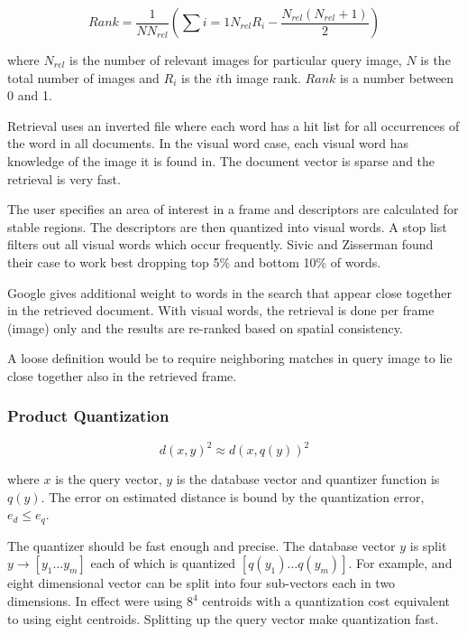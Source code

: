 \documentclass[english,12pt,a4paper,pdftex,elec,utf8]{aaltothesis}
\begin{document}
\begin{equation}\label{bowrank}
  Rank = \frac{1}{NN_{rel}}\left(\sum{i=1}{N_{rel}}R_{i}-\frac{N_{rel}(N_{rel} + 1)}{2}\right)
\end{equation}

where $N_{rel}$ is the number of relevant images for particular query image, $N$ is the total number of images and $R_{i}$ is the $i$th image rank. $Rank$ is a number between 0 and 1.

Retrieval uses an inverted file where each word has a hit list for all occurrences of the word in all documents. In the visual word case, each visual word has knowledge of the image it is found in. The document vector is sparse and the retrieval is very fast.

The user specifies an area of interest in a frame and descriptors are calculated for stable regions. The descriptors are then quantized into visual words. A stop list filters out all visual words which occur frequently. Sivic and Zisserman found their case to work best dropping top 5\% and bottom 10\% of words.

Google gives additional weight to words in the search that appear close together in the retrieved document. With visual words, the retrieval is done per frame (image) only and the results are re-ranked based on spatial consistency.

A loose definition would be to require neighboring matches in query image to lie close together also in the retrieved frame.

\subsubsection{Product Quantization} \label{PQ}

\begin{equation}
  \label{quantizereq}
d(x,y)^2 \approx d(x,q(y))^2
\end{equation}

where $x$ is the query vector, $y$ is the database vector and quantizer function is $q(y)$. The error on estimated distance is bound by the quantization error, $e_d \leq e_q$.  \cite{Jegou2014}

The quantizer should be fast enough and precise. The database vector $y$ is split $y \rightarrow [y_1 \ldots y_m]$ each of which is quantized $[q(y_1)\ldots q(y_m)]$. For example, and eight dimensional vector can be split into four sub-vectors each in two dimensions. In effect were using $8^4$ centroids with a quantization cost equivalent to using eight centroids. Splitting up the query vector make quantization fast. \cite{Jegou2014}
\end{document}
